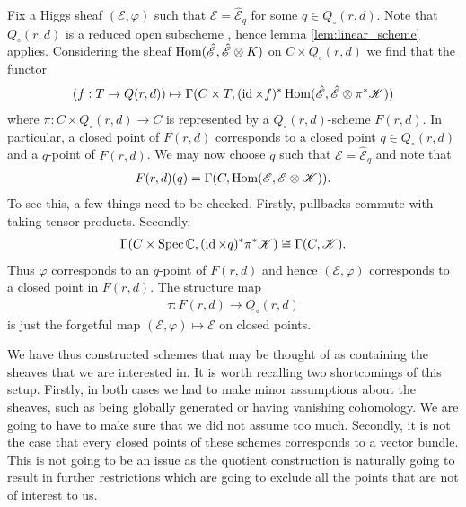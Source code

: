 \documentclass[12pt]{ociamthesis}  %
\begin{document}
\begin{example}\label{ex:quot_scheme_of_higgs}
  Fix a Higgs sheaf $(\mathscr E,\varphi)$ such that
  $\mathscr E = \hat{\mathscr E}_q$ for some $q\in Q_\circ(r,d)$.
  Note that $Q_\circ(r,d)$ is a reduced open subscheme
  \cite[281]{nitsure1991}, hence lemma
  \ref{lem:linear_scheme} applies.
  Considering the sheaf $\operatorname{Hom}(\hat{\mathscr E},\hat{\mathscr E}\otimes K)$ on
  $C\times Q_\circ(r,d)$ we find that the functor
  \begin{align*}
    (f:T\to Q(r,d))
    \mapsto
    \Gamma(C\times T,(\operatorname{id}\times f)^*\operatorname{Hom}(\hat{\mathscr E},\hat{\mathscr E}\otimes\pi^*\mathscr K))
  \end{align*}
  where $\pi : C\times Q_\circ(r,d)\to C$ is represented by a
  $Q_\circ(r,d)$-scheme $F(r,d)$.
  In particular, a closed point of $F(r,d)$ corresponds to a
  closed point $q\in Q_\circ(r,d)$ and a $q$-point of $F(r,d)$.
  We may now choose $q$ such that $\mathscr E = \hat{\mathscr E}_q$ and note
  that
  \begin{align*}
    F(r,d)(q) = \Gamma(C,\operatorname{Hom}(\mathscr E,\mathscr E\otimes\mathscr K)).
  \end{align*}
  To see this, a few things need to be checked. Firstly, pullbacks
  commute with taking tensor products. Secondly,
  \begin{align*}
    \Gamma(C\times\operatorname{Spec}\mathbb C,(\operatorname{id}\times q)^*\pi^*\mathscr K)
    \cong \Gamma(C,\mathscr K).
  \end{align*}
  Thus $\varphi$ corresponds to an $q$-point of $F(r,d)$
  and hence $(\mathscr E,\varphi)$ corresponds to a closed point in
  $F(r,d)$. The structure map
  \begin{align*}
    \tau : F(r,d) \longrightarrow Q_\circ(r,d)
  \end{align*}
  is just the forgetful map $(\mathscr E,\varphi) \mapsto \mathscr E$
  on closed points.
\end{example}

We have thus constructed schemes that may be thought of as containing
the sheaves that we are interested in. It is worth recalling two
shortcomings of this setup. Firstly, in both cases we had to make
minor assumptions about the sheaves, such as being globally generated
or having vanishing cohomology. We are going to have to make sure that
we did not assume too much. Secondly, it is not the case that every
closed points of these schemes corresponds to a vector bundle. This is
not going to be an issue as the quotient construction is naturally
going to result in further restrictions which are going to exclude
all the points that are not of interest to us.
\end{document}
